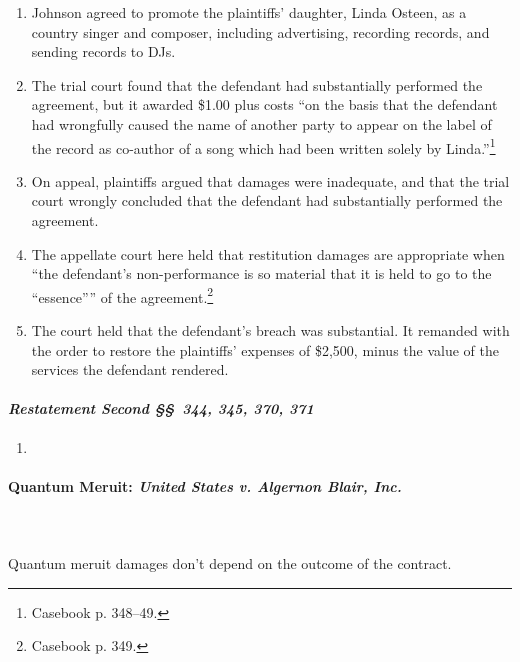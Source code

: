 \begin{enumerate}
    \item Johnson agreed to promote the plaintiffs' daughter, Linda Osteen, as 
    a country singer and composer, including advertising, recording records, 
    and sending records to DJs.
    \item The trial court found that the defendant had substantially performed 
    the agreement, but it awarded \$1.00 plus costs ``on the basis that the 
    defendant had wrongfully caused the name of another party to appear on the 
    label of the record as co-author of a song which had been written solely 
    by Linda.''\footnote{Casebook p. 348--49.}
    \item On appeal, plaintiffs argued that damages were inadequate, and that 
    the trial court wrongly concluded that the defendant had substantially 
    performed the agreement.
    \item The appellate court here held that restitution damages are 
    appropriate when ``the defendant's non-performance is so material that it 
    is held to go to the \enquote{essence}'' of the 
    agreement.\footnote{Casebook p. 349.}
    \item The court held that the defendant's breach was substantial. It 
    remanded with the order to restore the plaintiffs' expenses of \$2,500, 
    minus the value of the services the defendant rendered.
\end{enumerate}

\paragraph{\emph{Restatement Second \S\S\ 344, 345, 370, 371}}

\begin{enumerate}
    \item %
\end{enumerate}

\paragraph{Quantum Meruit: \emph{United States v. Algernon Blair, Inc.}}
~\\\\
Quantum meruit damages don't depend on the outcome of the contract.

